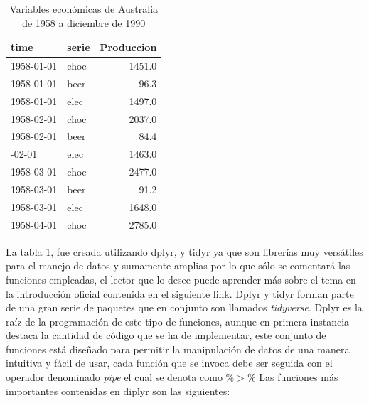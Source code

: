 \documentclass[
  spanish,
]{book}
\theoremstyle{remark}
\begin{document}
\begin{table}

\caption{\label{tab:australiatidy}Variables económicas de Australia de 1958 a diciembre de 1990 }
\centering
\begin{tabular}[t]{llr}
\toprule
time & serie & Produccion\\
\midrule
1958-01-01 & choc & 1451.0\\
1958-01-01 & beer & 96.3\\
1958-01-01 & elec & 1497.0\\
1958-02-01 & choc & 2037.0\\
1958-02-01 & beer & 84.4\\
\addlinespace
1958-02-01 & elec & 1463.0\\
1958-03-01 & choc & 2477.0\\
1958-03-01 & beer & 91.2\\
1958-03-01 & elec & 1648.0\\
1958-04-01 & choc & 2785.0\\
\bottomrule
\end{tabular}
\end{table}

La tabla \ref{tab:australiatidy}, fue creada utilizando dplyr, y tidyr ya que son librerías muy versátiles para el manejo de datos y sumamente amplias por lo que sólo se comentará las funciones empleadas, el lector que lo desee puede aprender más sobre el tema en la introducción oficial contenida en el siguiente \href{https://cran.r-project.org/web/packages/dplyr/vignettes/dplyr.html}{link}. Dplyr y tidyr forman parte de una gran serie de paquetes que en conjunto son llamados \emph{tidyverse}. Dplyr es la raíz de la programación de este tipo de funciones, aunque en primera instancia destaca la cantidad de código que se ha de implementar, este conjunto de funciones está diseñado para permitir la manipulación de datos de una manera intuitiva y fácil de usar, cada función que se invoca debe ser seguida con el operador denominado \emph{pipe} el cual se denota como \(\%>\%\) Las funciones más importantes contenidas en diplyr son las siguientes:
\end{document}
